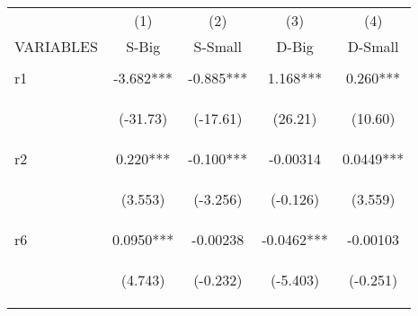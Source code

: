 \documentclass[]{article}
\begin{document}
\begin{center}
\begin{tabular}{lcccc} \hline
 & (1) & (2) & (3) & (4) \\
VARIABLES & S-Big & S-Small & D-Big & D-Small \\ \hline
\vspace{4pt} & \begin{footnotesize}\end{footnotesize} & \begin{footnotesize}\end{footnotesize} & \begin{footnotesize}\end{footnotesize} & \begin{footnotesize}\end{footnotesize} \\
r1 & -3.682*** & -0.885*** & 1.168*** & 0.260*** \\
\vspace{4pt} & \begin{footnotesize}(-31.73)\end{footnotesize} & \begin{footnotesize}(-17.61)\end{footnotesize} & \begin{footnotesize}(26.21)\end{footnotesize} & \begin{footnotesize}(10.60)\end{footnotesize} \\
r2 & 0.220*** & -0.100*** & -0.00314 & 0.0449*** \\
\vspace{4pt} & \begin{footnotesize}(3.553)\end{footnotesize} & \begin{footnotesize}(-3.256)\end{footnotesize} & \begin{footnotesize}(-0.126)\end{footnotesize} & \begin{footnotesize}(3.559)\end{footnotesize} \\
r6 & 0.0950*** & -0.00238 & -0.0462*** & -0.00103 \\
\vspace{4pt} & \begin{footnotesize}(4.743)\end{footnotesize} & \begin{footnotesize}(-0.232)\end{footnotesize} & \begin{footnotesize}(-5.403)\end{footnotesize} & \begin{footnotesize}(-0.251)\end{footnotesize} \\

\end{tabular}
\end{center}
\end{document}
